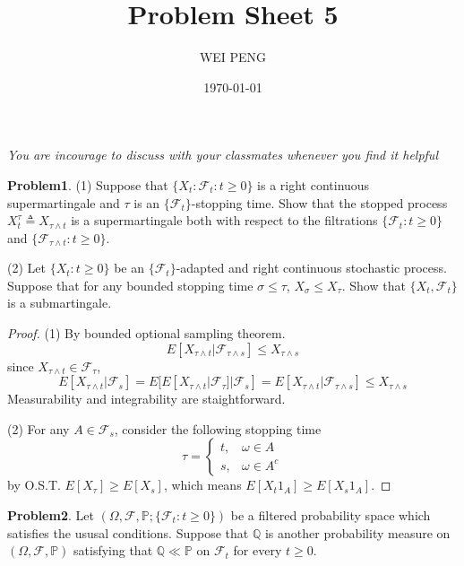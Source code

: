 \documentclass{article}     %
\title{Problem Sheet 5}  %
\author{WEI PENG}      %
\date{\today}      %
\begin{document}
\maketitle             %

\emph{You are incourage to discuss with your classmates whenever you find it helpful}

\noindent


\textbf{Problem1}. (1) Suppose that $\{X_t:\mathcal{F}_t:t\geq 0\}$ is a right continuous supermartingale and $\tau$ is an $\{\mathcal{F}_t\}$-stopping time. Show that the stopped process $X_t^{\tau} \triangleq X_{\tau \wedge t}$ is a supermartingale both with respect to the filtrations $\{\mathcal{F}_t:t\geq 0\}$ and $\{\mathcal{F}_{\tau \wedge t}:t\geq 0\}$.

(2) Let $\{X_t:t\geq 0\}$ be an $\{\mathcal{F}_t\}$-adapted and right continuous stochastic process. Suppose that for any bounded stopping time $\sigma \leq \tau$, $X_{\sigma}\leq X_{\tau}$. Show that $\{X_t,\mathcal{F}_t\}$ is a submartingale.

\begin{proof}
(1) By bounded optional sampling theorem.
\[E[X_{\tau \wedge t}|\mathcal{F}_{\tau \wedge s}]\leq X_{\tau \wedge s}\]
since $X_{\tau \wedge t}\in \mathcal{F}_{\tau}$,
\[E[X_{\tau \wedge t}|\mathcal{F}_s]=E[E[X_{\tau \wedge t}|\mathcal{F}_{\tau}]|\mathcal{F}_s]=E[X_{\tau \wedge t}|\mathcal{F}_{\tau\wedge s}]\leq X_{\tau \wedge s}\]
Measurability and integrability are staightforward.

(2) For any $A\in \mathcal{F}_s$, consider the following stopping time
\[\tau=\begin{cases}
t, & \omega \in A\\
s, & \omega \in A^c
\end{cases}\]
by O.S.T. $E[X_{\tau}]\geq E[X_s]$, which means $E[X_t1_A]\geq E[X_s1_A]$.
\end{proof}

\noindent
\textbf{Problem2}. Let $(\Omega,\mathcal{F},\mathbb{P};\{\mathcal{F}_t:t\geq 0\})$ be a filtered probability space which satisfies the ususal conditions. Suppose that $\mathbb{Q}$ is another probability measure on $(\Omega,\mathcal{F},\mathbb{P})$ satisfying that $\mathbb{Q}\ll \mathbb{P}$ on $\mathcal{F}_t$ for every $t\geq 0$.
\end{document}
